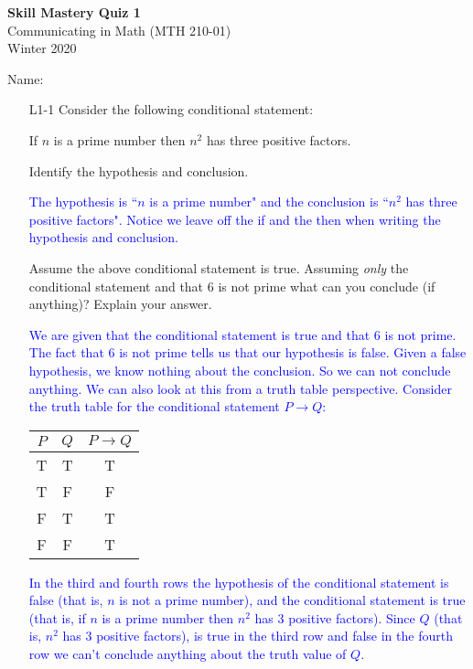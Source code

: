 \documentclass[10pt]{article}
\newcommand{\blue}{\textcolor{blue}}
\newcommand{\bs}{\begin{solution}}
\begin{document}
\vspace{-1.2in}
\begin{center} \textbf{\Large{Skill Mastery Quiz 1}} \\
Communicating in Math (MTH 210-01)\\
Winter 2020
\end{center}



\noindent Name: 




\begin{itemize}
	\item[L1-1] Consider the following conditional statement: 
	\begin{center}
	If $n$ is a prime number then $n^2$ has three positive factors.  
	\end{center}
	Identify the hypothesis and conclusion.
	
\bs \blue{ The hypothesis is ``$n$ is a prime number" and the conclusion is ``$n^2$ has three positive factors". Notice we leave off the if and the then when writing the hypothesis and conclusion.} \end{solution}

	\vspace{1in}
	Assume the above conditional statement is true. Assuming \emph{only} the conditional statement and that  $6$ is not prime what can you conclude (if anything)? Explain your answer.
	

\bs \blue{We are given that the conditional statement is true and that $6$ is not prime. The fact that $6$ is not prime tells us that our hypothesis is false. Given a false hypothesis, we know nothing about the conclusion. So we can not conclude anything. We can also look at this from a truth table perspective. Consider the truth table for the conditional statement $P\rightarrow Q$: 
 }
 \begin{center}
 \begin{tabular}{c|c|c}
$P$ &$Q$ &$P\rightarrow Q$\\
\hline
T &T &T\\
T &F &F\\
F &T &T\\
F &F &T
\end{tabular}
\end{center} 
\textcolor{blue}{In the third and fourth rows the hypothesis of the conditional statement is false (that is, $n$ is not a prime number), and the conditional statement is true (that is, if $n$ is a prime number then $n^2$ has $3$ positive factors). Since $Q$ (that is, $n^2$ has $3$ positive factors), is true in the third row and false in the fourth row we can't conclude anything about the truth value of $Q$.} \end{solution}


\end{itemize}
\end{document}
